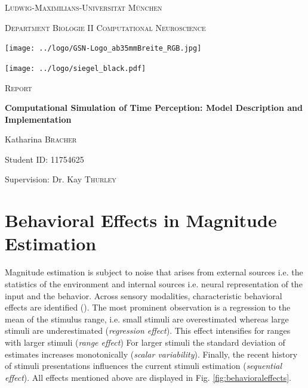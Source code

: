 \documentclass[9pt]{article}
\begin{document}

\begin{titlepage}
	\centering
	{\scshape\LARGE Ludwig-Maximilians-Universität München \par}
	{\scshape\large Department Biologie II Computational Neuroscience \par}
	\vspace{0.5cm}
	\texttt{[image: ../logo/GSN-Logo\_ab35mmBreite\_RGB.jpg]}\par
	\texttt{[image: ../logo/siegel\_black.pdf]}\par
	\vspace{0.7cm}
	{\scshape\LARGE Report \par}
	\vspace{0.05cm}
	{\huge\bfseries Computational Simulation of Time Perception: Model Description and Implementation \par}
	\vspace{1.1cm}
	{\Large Katharina \textsc{Bracher} \par}
	{Student ID: 11754625 \par}
	\vspace{0.4cm}
	{\large Supervision: Dr. Kay \textsc{Thurley} \par}
\end{titlepage}


\normalsize
\tableofcontents
\pagebreak


\section{Behavioral Effects in Magnitude Estimation}
Magnitude estimation is subject to noise that arises from external sources i.e. the statistics of the environment and internal sources i.e. neural representation of the input and the behavior.
Across sensory modalities, characteristic behavioral effects are identified (\cite{Petzschner2015}).
The most prominent observation is a regression to the mean of the stimulus range,  i.e. small stimuli are overestimated whereas large stimuli are underestimated (\textit{regression effect}). 
This effect intensifies for ranges with larger stimuli (\textit{range effect})
For larger stimuli the standard deviation of estimates increases monotonically (\textit{scalar variability}). 
Finally, the recent history of stimuli presentations influences the current stimuli estimation (\textit{sequential effect}).
All effects mentioned above are displayed in Fig. \ref{fig:behavioraleffects}. 
\end{document}
